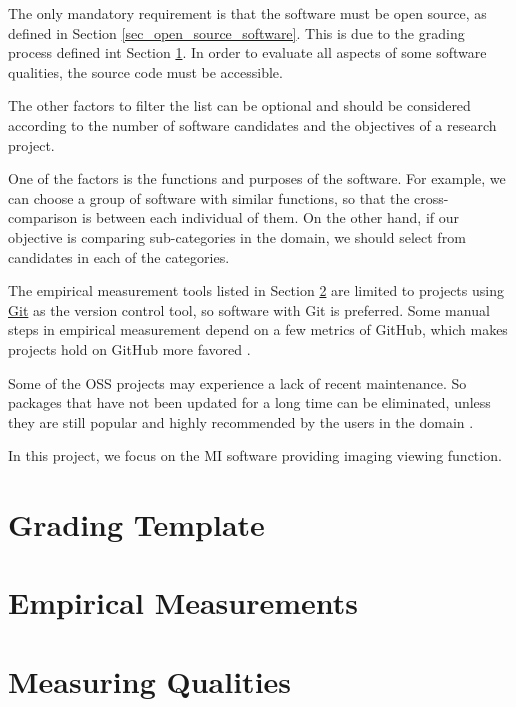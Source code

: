 The only mandatory requirement is that the software must be open source, as defined in Section \ref{sec_open_source_software}. This is due to the grading process defined int Section \ref{sec_grading_template}. In order to evaluate all aspects of some software qualities, the source code must be accessible.

The other factors to filter the list can be optional and should be considered according to the number of software candidates and the objectives of a research project.

One of the factors is the functions and purposes of the software. For example, we can choose a group of software with similar functions, so that the cross-comparison is between each individual of them. On the other hand, if our objective is comparing sub-categories in the domain, we should select from candidates in each of the categories.

The empirical measurement tools listed in Section \ref{sec_empirical_measurements} are limited to projects using \hyperlink{https://git-scm.com/}{Git} as the version control tool, so software with Git is preferred. Some manual steps in empirical measurement depend on a few metrics of GitHub, which makes projects hold on GitHub more favored \cite{SmithEtAl2021}.

Some of the OSS projects may experience a lack of recent maintenance. So packages that have not been updated for a long time can be eliminated, unless they are still popular and highly recommended by the users in the domain \cite{SmithEtAl2021}.

In this project, we focus on the MI software providing imaging viewing function. 

\section{Grading Template}
\label{sec_grading_template}


\section{Empirical Measurements}
\label{sec_empirical_measurements}


\section{Measuring Qualities}
\label{sec_measuring_qualities}

